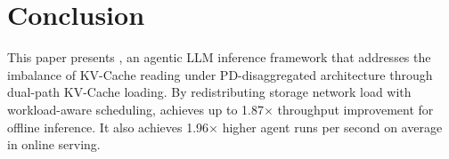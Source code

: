 \section{Conclusion}
\label{sec:conclusion}

This paper presents \sysname, an agentic LLM inference framework that addresses the imbalance of KV-Cache reading under PD-disaggregated architecture through dual-path KV-Cache loading. By redistributing storage network load with workload-aware scheduling, \sysname achieves up to 1.87$\times$ throughput improvement for offline inference. It also achieves 1.96$\times$ higher agent runs per second on average in online serving.

